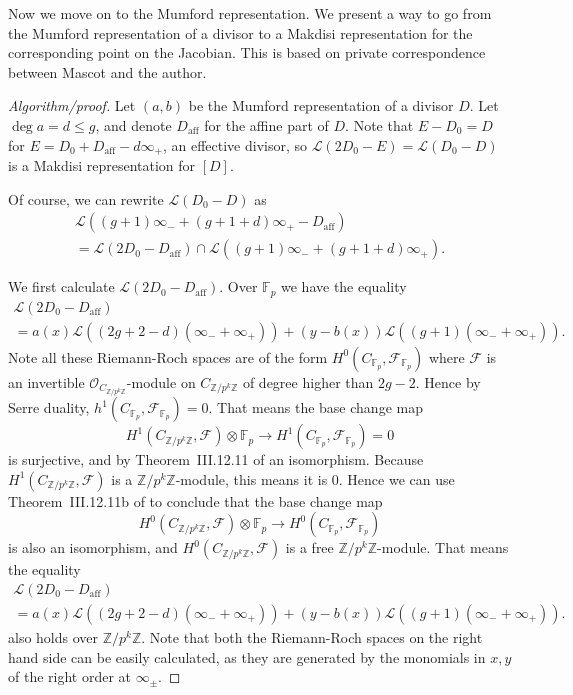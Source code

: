 \documentclass[12pt]{article}
\newcommand{\Z}{\mathbb{Z}}
\newcommand{\Fcal}{\mathcal{F}}
\newcommand{\Lcal}{\mathcal{L}}
\renewcommand{\O}{\mathcal{O}}
\newcommand{\F}{\mathbb{F}}
\newcommand{\tensor}{\otimes}
\theoremstyle{plain}
\theoremstyle{definition}
\theoremstyle{remark}
\begin{document}
Now we move on to the Mumford representation. We present a way to go from the Mumford representation of a divisor to a Makdisi representation for the corresponding point on the Jacobian. This is based on private correspondence between Mascot and the author.
\begin{proof}[Algorithm/proof]
Let $(a,b)$ be the Mumford representation of a divisor $D$. Let $\deg a = d \leq g$, and denote $D_{\text{aff}}$ for the affine part of $D$. Note that $E-D_0 = D$ for $E = D_0 + D_{\text{aff}} - d\infty_+$, an effective divisor, so $\Lcal(2D_0 - E) = \Lcal(D_0 - D)$ is a Makdisi representation for $[D]$.

Of course, we can rewrite $\Lcal(D_0 -D)$ as 
\begin{multline*}
\Lcal((g+1)\infty_- + (g+1+d)\infty_+ - D_{\text{aff}}) \\= \Lcal(2D_0 - D_{\text{aff}} ) \cap \Lcal((g+1)\infty_- + (g+1+d)\infty_+).
\end{multline*}

We first calculate $\Lcal(2D_0 - D_{\text{aff}})$. Over $\F_p$ we have the equality
\begin{multline*}
\Lcal(2D_0 - D_{\text{aff}}) \\= a(x)\Lcal((2g+2-d)(\infty_- + \infty_+)) + (y-b(x))\Lcal((g+1)(\infty_- + \infty_+)).
\end{multline*}
Note all these Riemann-Roch spaces are of the form $H^0(C_{\F_p},\Fcal_{\F_p})$ where $\Fcal$ is an invertible $\O_{C_{\Z/p^k\Z}}$-module on $C_{\Z/p^k\Z}$ of degree higher than $2g-2$. Hence by Serre duality, $h^{1}(C_{\F_p},\Fcal_{\F_p}) = 0$. That means the base change map 
\[H^1(C_{\Z/p^k\Z},\Fcal) \tensor \F_p \to H^1(C_{\F_p},\Fcal_{\F_p}) = 0\]
is surjective, and by Theorem~III.12.11 of \cite{hartshorne} an isomorphism. Because $H^1(C_{\Z/p^k\Z},\Fcal)$ is a $\Z/p^k\Z$-module, this means it is $0$. Hence we can use Theorem~III.12.11b of \cite{hartshorne} to conclude that the base change map 
\[H^0(C_{\Z/p^k\Z},\Fcal) \tensor \F_p \to H^0(C_{\F_p},\Fcal_{\F_p})\]
is also an isomorphism, and $H^0(C_{\Z/p^k\Z},\Fcal)$ is a free $\Z/p^k\Z$-module. That means the equality 
\begin{multline*}
\Lcal(2D_0 - D_{\text{aff}}) \\= a(x)\Lcal((2g+2-d)(\infty_- + \infty_+)) + (y-b(x))\Lcal((g+1)(\infty_- + \infty_+)).
\end{multline*}
also holds over $\Z/p^k\Z$. Note that both the Riemann-Roch spaces on the right hand side can be easily calculated, as they are generated by the monomials in $x,y$ of the right order at $\infty_{\pm}$.


\end{proof}
\end{document}
